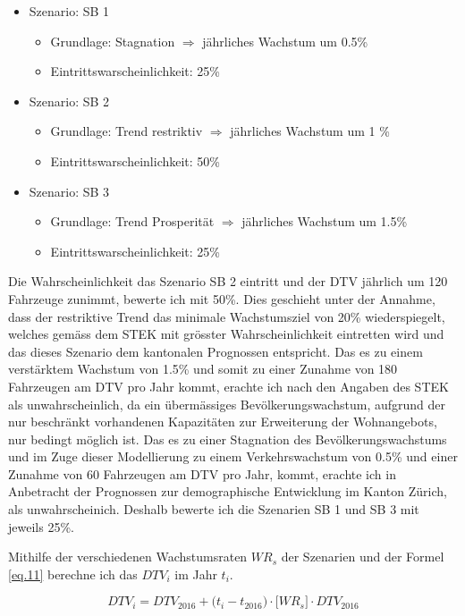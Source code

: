 \begin{itemize}
\item Szenario: SB 1
	\begin{itemize}
	\item Grundlage: Stagnation $\Rightarrow$ jährliches Wachstum um 0.5\%
	\item Eintrittswarscheinlichkeit: 25\%
	\end{itemize}
\item Szenario: SB 2
	\begin{itemize}
	\item Grundlage: Trend restriktiv  $\Rightarrow$ jährliches Wachstum um 1 \%
	\item Eintrittswarscheinlichkeit: 50\%
	\end{itemize}
\item Szenario: SB 3
	\begin{itemize}
	\item Grundlage: Trend Prosperität  $\Rightarrow$ jährliches Wachstum um 1.5\%
	\item Eintrittswarscheinlichkeit: 25\%
	\end{itemize}
\end{itemize}

Die Wahrscheinlichkeit das Szenario SB 2 eintritt und der DTV jährlich um 120 Fahrzeuge zunimmt, bewerte ich mit 50\%. Dies geschieht unter der Annahme, dass der restriktive Trend das minimale Wachstumsziel von 20\% wiederspiegelt, welches gemäss dem STEK mit grösster Wahrscheinlichkeit eintretten wird und das dieses Szenario dem kantonalen Prognossen entspricht. 
Das es zu einem verstärktem Wachstum von 1.5\% und somit zu einer Zunahme von 180 Fahrzeugen am DTV pro Jahr kommt, erachte ich nach den Angaben des STEK als unwahrscheinlich, da ein übermässiges Bevölkerungswachstum, aufgrund der nur beschränkt vorhandenen Kapazitäten zur Erweiterung der Wohnangebots, nur bedingt möglich ist. Das es zu einer Stagnation des Bevölkerungswachstums und im Zuge dieser Modellierung zu einem Verkehrswachstum von 0.5\% und einer Zunahme von 60 Fahrzeugen am DTV pro Jahr, kommt, erachte ich in Anbetracht der Prognossen zur demographische Entwicklung im Kanton Zürich, als unwahrscheinich. Deshalb bewerte ich die Szenarien SB 1 und SB 3 mit jeweils 25\%.

Mithilfe der verschiedenen Wachstumsraten $WR_{s}$ der Szenarien und der Formel \ref{eq.11} berechne ich das $DTV_{i}$ im Jahr $t_{i}$.

\begin{equation*}
DTV_{i} = DTV_{2016} + \bigl( t_{i} - t_{2016} \bigr) \cdot \bigl[WR_{s}\bigr] \cdot DTV_{2016}
\label{eq.11}
\end{equation*}

